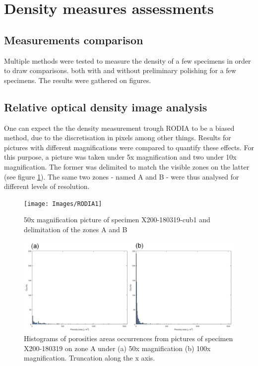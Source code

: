 \section{Density measures assessments}

\subsection{Measurements comparison}

Multiple methods were tested to measure the density of a few specimens in order to draw comparisons. both with and without preliminary polishing for a few specimens. The results were gathered on figures.


\subsection{Relative optical density image analysis}
\label{RRODIA}
One can expect the the density measurement trough RODIA to be a biased method, due to the discretisation in pixels among other things. Results for pictures with different magnifications were compared to quantify these effects. For this purpose, a picture was taken under 5x magnification and two under 10x magnification. The former was delimited to match the visible zones on the latter (see figure \ref{fig:RODIA1}). The same two zones - named A and B - were thus analysed for different levels of resolution.\\

\begin{figure}[ht]
	\centering
	\centerline{\texttt{[image: Images/RODIA1]}}
	\decoRule
	\caption[50x magnification picture of specimen X200-180319-cub1 and delimitation of the zones A and B]{50x magnification picture of specimen X200-180319-cub1 and delimitation of the zones A and B}
	\label{fig:RODIA1}
\end{figure}

\begin{figure}[ht]
	\centering
	\centerline{\includegraphics[scale=0.43]{Images/RODIAHist}}
	\decoRule
	\caption[Histograms of porosities areas occurrences from pictures of specimen X200-180319 on zone A under (a) 50x magnification (b) 100x magnification]{Histograms of porosities areas occurrences from pictures of specimen X200-180319 on zone A under (a) 50x magnification (b) 100x magnification. Truncation along the x axis. }
	\label{fig:RODIAH}
\end{figure}


